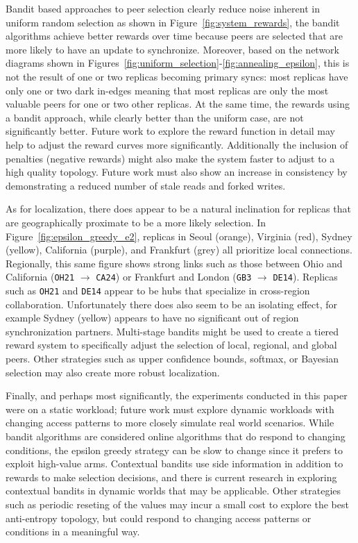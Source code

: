 Bandit based approaches to peer selection clearly reduce noise inherent
in uniform random selection as shown in Figure~\ref{fig:system_rewards},
the bandit algorithms achieve better rewards over time because peers
are selected that are more likely to have an update to synchronize.
Moreover, based on the network diagrams shown in
Figures~\ref{fig:uniform_selection}-\ref{fig:annealing_epsilon}, this is
not the result of one or two replicas becoming primary syncs: most
replicas have only one or two dark in-edges meaning that most replicas
are only the most valuable peers for one or two other replicas.
At the same time, the rewards using a bandit approach, while clearly better
than the uniform case, are not significantly better.
Future work to explore the reward function in detail may help to adjust
the reward curves more significantly.
Additionally the inclusion of penalties (negative rewards) might also make
the system faster to adjust to a high quality topology.
Future work must also show an increase in consistency by demonstrating a
reduced number of stale reads and forked writes.

As for localization, there does appear to be a natural inclination for
replicas that are geographically proximate to be a more likely selection.
In Figure~\ref{fig:epsilon_greedy_e2}, replicas in Seoul (orange), Virginia
(red), Sydney (yellow), California (purple), and Frankfurt (grey) all
prioritize local connections.
Regionally, this same figure shows strong links such as those between Ohio
and California (\texttt{OH21} $\rightarrow$ \texttt{CA24}) or Frankfurt and
London (\texttt{GB3} $\rightarrow$ \texttt{DE14}).
Replicas such as \texttt{OH21} and \texttt{DE14} appear to be hubs that
specialize in cross-region collaboration.
Unfortunately there does also seem to be an isolating effect, for example
Sydney (yellow) appears to have no significant out of region synchronization
partners.
Multi-stage bandits might be used to create a tiered reward system to
specifically adjust the selection of local, regional, and global peers.
Other strategies such as upper confidence bounds, softmax, or Bayesian
selection may also create more robust localization.

Finally, and perhaps most significantly, the experiments conducted in
this paper were on a static workload; future work must explore dynamic
workloads with changing access patterns to more closely simulate real
world scenarios.
While bandit algorithms are considered online algorithms that do respond
to changing conditions, the epsilon greedy strategy can be slow to change
since it prefers to exploit high-value arms.
Contextual bandits use side information in addition to rewards to make
selection decisions, and there is current research in exploring contextual
bandits in dynamic worlds that may be applicable.
Other strategies such as periodic reseting of the values may incur a small
cost to explore the best anti-entropy topology, but could respond to changing
access patterns or conditions in a meaningful way.

